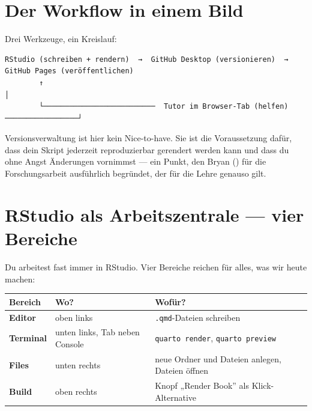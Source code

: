 \documentclass[
  ngerman,
  a4paper,
  DIV=11]{scrreprt}
\begin{document}
\section{Der Workflow in einem Bild}\label{der-workflow-in-einem-bild}

Drei Werkzeuge, ein Kreislauf:

\begin{verbatim}
RStudio (schreiben + rendern)  →  GitHub Desktop (versionieren)  →  GitHub Pages (veröffentlichen)
        ↑                                                                            │
        └──────────────────────────  Tutor im Browser-Tab (helfen)  ─────────────────┘
\end{verbatim}

Versionsverwaltung ist hier kein Nice-to-have. Sie ist die Voraussetzung
dafür, dass dein Skript jederzeit reproduzierbar gerendert werden kann
und dass du ohne Angst Änderungen vornimmst --- ein Punkt, den Bryan
() für die Forschungsarbeit ausführlich
begründet, der für die Lehre genauso gilt.

\section{RStudio als Arbeitszentrale --- vier
Bereiche}\label{rstudio-als-arbeitszentrale-vier-bereiche}

Du arbeitest fast immer in RStudio. Vier Bereiche reichen für alles, was
wir heute machen:

\begin{longtable}[]{@{}
  >{\raggedright\arraybackslash}p{}
  >{\raggedright\arraybackslash}p{}
  >{\raggedright\arraybackslash}p{}@{}}
\toprule\noalign{}
\begin{minipage}[b]{\linewidth}\raggedright
Bereich
\end{minipage} & \begin{minipage}[b]{\linewidth}\raggedright
Wo?
\end{minipage} & \begin{minipage}[b]{\linewidth}\raggedright
Wofür?
\end{minipage} \\
\midrule\noalign{}
\endhead
\bottomrule\noalign{}
\endlastfoot
\textbf{Editor} & oben links & \texttt{.qmd}-Dateien schreiben \\
\textbf{Terminal} & unten links, Tab neben Console &
\texttt{quarto\ render}, \texttt{quarto\ preview} \\
\textbf{Files} & unten rechts & neue Ordner und Dateien anlegen, Dateien
öffnen \\
\textbf{Build} & oben rechts & Knopf „Render Book'' als
Klick-Alternative \\
\end{longtable}
\end{document}
